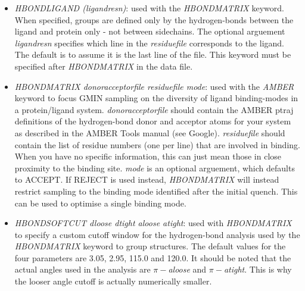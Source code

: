 \documentclass[12pt,a4paper,dvips]{article}
\begin{document}
\begin{itemize}

\item{\it HBONDLIGAND (ligandresn)\/}: used with the {\it HBONDMATRIX} keyword. When specified, groups are defined only
by the hydrogen-bonds between the ligand and protein only - not between sidechains. The optional arguement {\it ligandresn}
specifies which line in the {\it residuefile} corresponds to the ligand. The default is to assume it is the last line of the file.
This keyword must be specified after {\it HBONDMATRIX} in the data file.

\item{\it HBONDMATRIX donoracceptorfile residuefile mode\/}: used with the {\it AMBER} keyword to focus GMIN sampling on 
the diversity of ligand binding-modes in a protein/ligand system. {\it donoracceptorfile} should contain the AMBER ptraj
definitions of the hydrogen-bond donor and acceptor atoms for your system as described in the AMBER Tools manual (see Google).
{\it residuefile} should contain the list of residue numbers (one per line) that are involved in binding. When you have no 
specific information, this can just mean those in close proximity to the binding site. {\it mode} is an optional arguement, which
defaults to ACCEPT. If REJECT is used instead, {\it HBONDMATRIX} will instead restrict sampling to the binding mode identified after
the initial quench. This can be used to optimise a single binding mode.

\item{\it HBONDSOFTCUT dloose dtight aloose atight\/}: used with {\it HBONDMATRIX} to specify a custom cutoff window for the
hydrogen-bond analysis used by the {\it HBONDMATRIX} keyword to group structures. The default values for the four parameters are 
3.05, 2.95, 115.0 and 120.0. It should be noted that the actual angles used in the analysis are $\pi-${\it aloose} and 
$\pi-${\it atight}. This is why the looser angle cutoff is actually numerically smaller. 


\end{itemize}
\end{document}
